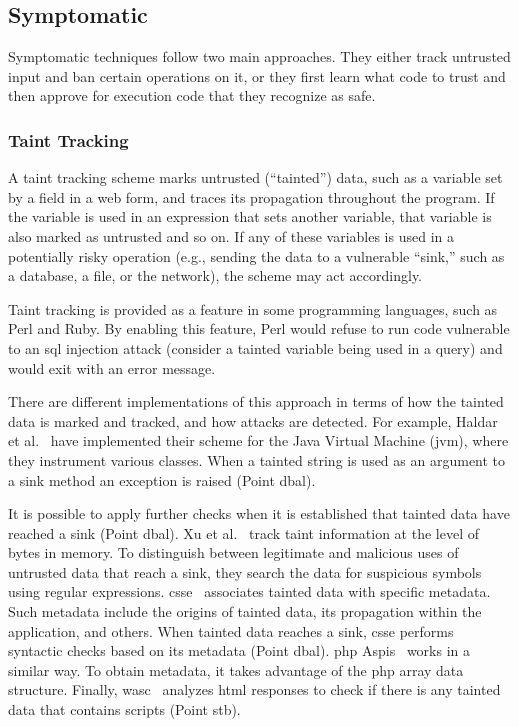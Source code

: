 \documentclass[conference]{IEEEtran}
\begin{document}
\subsection{Symptomatic}

Symptomatic techniques follow two main approaches. They either track
untrusted input and ban certain operations on it, or they first learn what
code to trust and then approve for execution code that they recognize
as safe.

\subsubsection{Taint Tracking}
\label{sec:taint}

A taint tracking scheme marks untrusted (``tainted'') data, such as
a variable set by a field in a web form, and traces its propagation
throughout the program. If the variable is used in an expression that
sets another variable, that variable is also marked as untrusted and
so on. If any of these variables is used in a potentially risky
operation (e.g., sending the data to a vulnerable ``sink,'' such as
a database, a file, or the network), the scheme may act accordingly.

Taint tracking is provided as a feature in some programming languages,
such as Perl and Ruby. By enabling this feature, Perl would refuse to
run code vulnerable to an {\sc sql} injection attack (consider a
tainted variable being used in a query) and would exit with an error
message.

There are different implementations of this approach
in terms of how the tainted data is marked and tracked,
and how attacks are detected.
For example, Haldar et al.~\cite{HCF05} have implemented
their scheme for the Java Virtual Machine ({\sc jvm}),
where they instrument various classes. When a
tainted string is used as an argument to a sink method
an exception is raised (Point {\sc dbal}).

It is possible to apply further checks when it is established that
tainted data have reached a sink (Point {\sc dbal}).
Xu et al.~\cite{XBS06} track taint information at the level of bytes in
memory. To distinguish between legitimate and malicious uses of
untrusted data that reach a sink, they search the data for suspicious
symbols using regular expressions. {\sc csse}~\cite{PB05}
associates tainted data with specific metadata. Such metadata include
the origins of tainted data, its propagation within the application,
and others. When tainted data reaches a sink, {\sc csse} performs
syntactic checks based on its metadata (Point {\sc dbal}).
{\sc php} Aspis~\cite{PMP11} works in a similar way. To obtain
metadata, it takes advantage of the  {\sc php} array data structure.
Finally, {\sc wasc}~\cite{NLC07} analyzes {\sc html} responses to check
if there is any tainted data that contains scripts (Point {\sc s}t{\sc b}).
\end{document}

